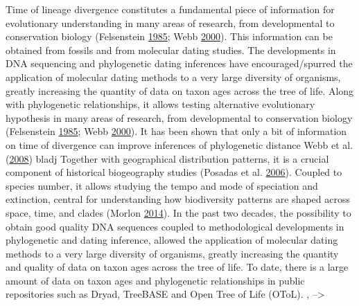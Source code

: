 \documentclass[]{article}
\title{}
\author{}
\date{}
\begin{document}
Time of lineage divergence
constitutes a fundamental piece of information for evolutionary
understanding in many areas of research, from developmental to conservation biology (Felsenstein \protect\hyperlink{ref-Felsenstein1985a}{1985}; Webb \protect\hyperlink{ref-Webb2000}{2000}). This information can be obtained from fossils and from molecular dating studies. The developments in DNA sequencing and phylogenetic dating inferences have encouraged/spurred the application of molecular dating methods to a very large diversity of organisms, greatly increasing the quantity
of data on taxon ages across the tree of life.
Along with phylogenetic relationships, it allows testing alternative
evolutionary hypothesis in many areas of research, from developmental to conservation biology (Felsenstein \protect\hyperlink{ref-Felsenstein1985a}{1985}; Webb \protect\hyperlink{ref-Webb2000}{2000}).
It has been shown that only a bit of information on time of divergence can improve inferences of phylogenetic distance Webb et al. (\protect\hyperlink{ref-Webb2008}{2008}) bladj
Together with geographical distribution patterns, it is a crucial component of historical biogeography studies (Posadas et al. \protect\hyperlink{ref-posadas2006historical}{2006}).
Coupled to species number, it allows studying the tempo and mode of speciation and extinction,
central for understanding how biodiversity
patterns are shaped across space, time, and clades (Morlon \protect\hyperlink{ref-Morlon2014}{2014}).
In the past two decades, the possibility to obtain good quality DNA sequences
coupled to methodological developments in phylogenetic and dating inference, allowed
the application of molecular dating methods to a very large diversity
of organisms, greatly increasing the quantity and quality of data on taxon ages across the tree of life.
To date, there is a large amount of
data on taxon ages and phylogenetic relationships in public repositories such as Dryad, TreeBASE
and Open Tree of Life (OToL).
, --\textgreater{}
\end{document}
